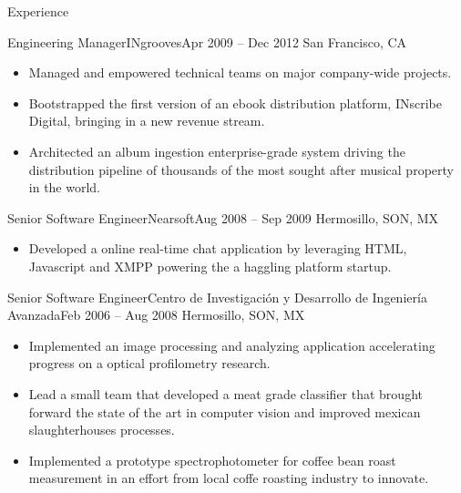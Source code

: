 \documentclass[calibri]{mcdowellcv}
\begin{document}
\begin{cvsection}{Experience}
	\begin{cvsubsection}{Engineering Manager}{INgrooves}{Apr 2009 -- Dec 2012}
		San Francisco, CA
		\begin{itemize}%
			\item Managed and empowered technical teams on major company-wide projects.
			\item Bootstrapped the first version of an ebook distribution platform, INscribe Digital, bringing in a new revenue stream.
			\item Architected an album ingestion enterprise-grade system driving the distribution pipeline of thousands of the most sought after musical property in the world.
		\end{itemize}
	\end{cvsubsection}
	\vskip 0.3in
	\begin{cvsubsection}{Senior Software Engineer}{Nearsoft}{Aug 2008 -- Sep 2009}
		Hermosillo, SON, MX
		\begin{itemize}%
			\item Developed a online real-time chat application by leveraging HTML, Javascript and XMPP powering the a haggling platform startup.
		\end{itemize}
	\end{cvsubsection}
	\vskip 0.3in
	\begin{cvsubsection}{Senior Software Engineer}{Centro de Investigación y Desarrollo de Ingeniería Avanzada}{Feb 2006 -- Aug 2008}
		Hermosillo, SON, MX
		\begin{itemize}%
			\item Implemented an image processing and analyzing application accelerating progress on a optical profilometry research.
			\item Lead a small team that developed a meat grade classifier that brought forward the state of the art in computer vision and improved mexican slaughterhouses processes.
			\item Implemented a prototype spectrophotometer for coffee bean roast measurement in an effort from local coffe roasting industry to innovate.
		\end{itemize}
	\end{cvsubsection}
\end{cvsection}
\end{document}
